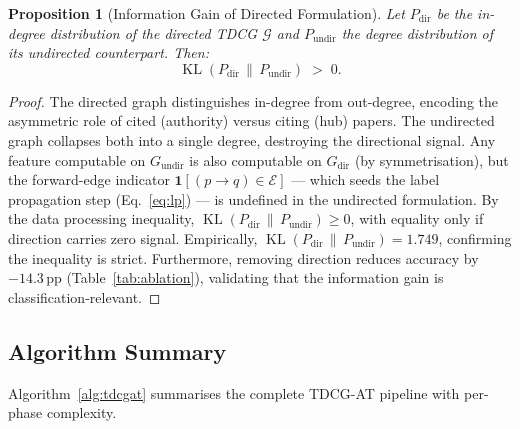 \documentclass[letterpaper]{article}
\theoremstyle{plain}
\newtheorem{proposition}[theorem]{Proposition}
\theoremstyle{definition}
\theoremstyle{remark}
\newcommand{\G}{\mathcal{G}}
\newcommand{\E}{\mathcal{E}}
\newcommand{\I}[1]{\mathbf{1}\!\left[#1\right]}
\newcommand{\KL}[2]{\operatorname{KL}\!\left(#1\,\|\,#2\right)}
\begin{document}
\begin{proposition}[Information Gain of Directed Formulation]
\label{prop:kl}
Let $P_{\operatorname{dir}}$ be the in-degree distribution of
the directed TDCG $\G$ and
$P_{\operatorname{undir}}$ the degree distribution of its
undirected counterpart.
Then:
\begin{equation}
    \KL{P_{\operatorname{dir}}}{P_{\operatorname{undir}}}
    \;>\; 0.
    \label{eq:kl}
\end{equation}
\end{proposition}

\begin{proof}
The directed graph distinguishes in-degree from out-degree,
encoding the asymmetric role of cited (authority) versus
citing (hub) papers.
The undirected graph collapses both into a single degree,
destroying the directional signal.
Any feature computable on $G_{\operatorname{undir}}$ is also
computable on $G_{\operatorname{dir}}$ (by symmetrisation),
but the forward-edge indicator
$\I{(p \to q) \in \E}$ ---
which seeds the label propagation step (Eq.~\eqref{eq:lp})
--- is undefined in the undirected formulation.
By the data processing inequality,
$\KL{P_{\operatorname{dir}}}{P_{\operatorname{undir}}} \geq 0$,
with equality only if direction carries zero signal.
Empirically, $\KL{P_{\operatorname{dir}}}{P_{\operatorname{undir}}} = 1.749$,
confirming the inequality is strict.
Furthermore, removing direction reduces accuracy by
$-14.3$\,pp (Table~\ref{tab:ablation}),
validating that the information gain is classification-relevant.
\end{proof}

\subsection{Algorithm Summary}
\label{sec:algorithm}

Algorithm~\ref{alg:tdcgat} summarises the complete
TDCG-AT pipeline with per-phase complexity.
\end{document}
